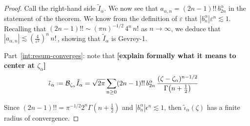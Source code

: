 \documentclass[11pt,a4paper,twoside,leqno,noamsfonts]{amsart}
\numberwithin{equation}{section}
\begin{document}
\begin{proof}
Call the right-hand side $\tilde{I}_\alpha$. We now see that $a_{\alpha,n} = (2n-1)!!\,b_{2n}^\alpha$ in the statement of the theorem. We know from the definition of $\varepsilon$ that $\left|b_n^\alpha\right| \varepsilon^n \lesssim 1$. Recalling that $(2n - 1)!! \sim (\pi n)^{-1/2}\,4^n\,n!$ as $n \to \infty$, we deduce that $|a_{\alpha,n}| \lesssim \left(\tfrac{4}{\varepsilon^2}\right)^n\,n!\,$, showing that $\tilde{I}_\alpha$ is Gevrey-1.%



Part~\eqref{int:resum-converges}: note that \textbf{[explain formally what it means to center at $\zeta_\alpha$]}
\begin{align*}
\tilde{\iota}_{\alpha}\defeq \mathcal{B}_{\zeta_\alpha} \tilde{I}_\alpha & = \sqrt{2\pi} \sum_{n \ge 0} (2n-1)!!\,b_{2n}^\alpha\,\frac{(\zeta - \zeta_\alpha)^{n-1/2}}{\Gamma\big(n+\tfrac{1}{2}\big)} 
\end{align*}

Since ${(2n-1)!!}=\pi^{-1/2} 2^n{\Gamma\left(n+\tfrac{1}{2}\right)}$ and $|b_n^\alpha|\epsilon^n\lesssim 1$, then $\tilde{\iota}_{\alpha}(\zeta)$ has a finite radius of convergence. 



\end{proof}
\end{document}

